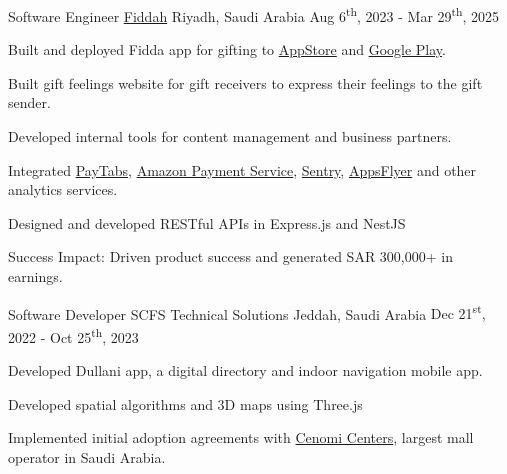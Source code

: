 \begin{cventries}
    \cventry
    {Software Engineer}
    {\href{https://linktr.ee/fiddahco}{Fiddah}}
    {Riyadh, Saudi Arabia}
    {Aug 6\textsuperscript{th}, 2023 - Mar 29\textsuperscript{th}, 2025}
    {
        \begin{cvitems}
            \item {Built and deployed Fidda app for gifting to \href{https://apps.apple.com/sa/app/fiddah/id6467870513}{AppStore} and \href{https://play.google.com/store/apps/details?id=com.fidda.fidda&pcampaignid=web_share}{Google Play}.}
            \item {Built gift feelings website for gift receivers to express their feelings to the gift sender.}
            \item {Developed internal tools for content management and business partners.}
            \item {Integrated \href{https://site.paytabs.com}{PayTabs}, \href{https://paymentservices.amazon.com}{Amazon Payment Service}, \href{https://sentry.io}{Sentry}, \href{https://www.appsflyer.com}{AppsFlyer} and other analytics services.}
            \item {Designed and developed RESTful APIs in Express.js and NestJS}
            \item {Success Impact: Driven product success and generated SAR 300,000+ in earnings.}
        \end{cvitems}
    }


    \cventry
    {Software Developer}
    {SCFS Technical Solutions}
    {Jeddah, Saudi Arabia}
    {Dec 21\textsuperscript{st}, 2022 - Oct 25\textsuperscript{th}, 2023}
    {
        \begin{cvitems}
            \item {Developed Dullani app, a digital directory and indoor navigation mobile app.}
            \item {Developed spatial algorithms and 3D maps using Three.js}
            \item {Implemented initial adoption agreements with \href{https://centers.cenomi.com/sa-en/malls/}{Cenomi Centers}, largest mall operator in Saudi Arabia.}
        \end{cvitems}
    }


\end{cventries}
